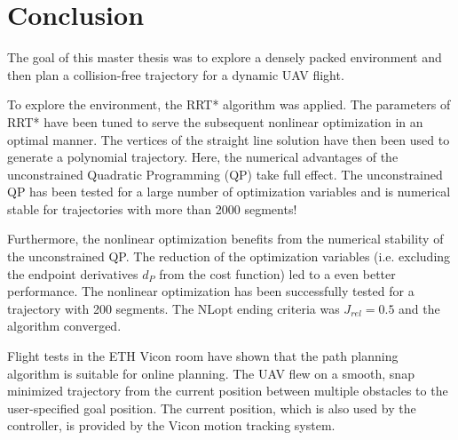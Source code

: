 \chapter{Conclusion}\label{chap:Conclusion}

The goal of this master thesis was to explore a densely packed environment and then plan a collision-free trajectory for a dynamic UAV flight. \newline

To explore the environment, the RRT* algorithm was applied. The parameters of RRT* have been tuned to serve the subsequent nonlinear optimization in an optimal manner. The vertices of the straight line solution have then been used to generate a polynomial trajectory. Here, the numerical advantages of the unconstrained Quadratic Programming (QP) take full effect. The unconstrained QP has been tested for a large number of optimization variables and is numerical stable for trajectories with more than 2000 segments! \newline

Furthermore, the nonlinear optimization benefits from the numerical stability of the unconstrained QP. The reduction of the optimization variables (i.e. excluding the endpoint derivatives $d_P$ from the cost function) led to a even better performance. The nonlinear optimization has been successfully tested for a trajectory with 200 segments. The NLopt ending criteria was $J_{rel} = 0.5$ and the algorithm converged. \newline

Flight tests in the ETH Vicon room have shown that the path planning algorithm is suitable for online planning. The UAV flew on a smooth, snap minimized trajectory from the current position between multiple obstacles to the user-specified goal position. The current position, which is also used by the controller, is provided by the Vicon motion tracking system. 




